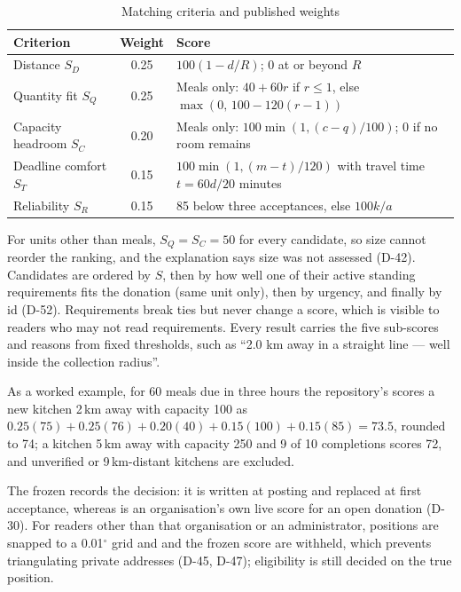 \begin{table}[!htbp]
\centering
\small
\begin{tabular}{|L{3.3cm}|c|L{8.3cm}|}
  \hline
  \textbf{Criterion} & \textbf{Weight} & \textbf{Score} \\
  \hline
  Distance $S_D$ & 0.25 & $100(1-d/R)$; 0 at or beyond $R$ \\
  \hline
  Quantity fit $S_Q$ & 0.25 & Meals only: $40+60r$ if $r\le1$, else $\max(0,\,100-120(r-1))$ \\
  \hline
  Capacity headroom $S_C$ & 0.20 & Meals only: $100\min(1,(c-q)/100)$; 0 if no room remains \\
  \hline
  Deadline comfort $S_T$ & 0.15 & $100\min(1,(m-t)/120)$ with travel time $t=60d/20$ minutes \\
  \hline
  Reliability $S_R$ & 0.15 & 85 below three acceptances, else $100k/a$ \\
  \hline
\end{tabular}
\caption{Matching criteria and published weights}
\label{tab:criteria}
\end{table}

For units other than meals, $S_Q=S_C=50$ for every candidate, so size cannot
reorder the ranking, and the explanation says size was not assessed (D-42).
Candidates are ordered by $S$, then by how well one of their active standing
requirements fits the donation (same unit only), then by urgency, and finally by
id (D-52). Requirements break ties but never change a score, which is visible to
readers who may not read requirements. Every result carries
the five sub-scores and reasons from fixed thresholds, such as ``2.0 km away in a
straight line --- well inside the collection radius''.

As a worked example, for 60 meals due in three hours the repository's
 scores a new kitchen 2\,km away with capacity 100 as
$0.25(75)+0.25(76)+0.20(40)+0.15(100)+0.15(85)=73.5$, rounded to 74; a kitchen
5\,km away with capacity 250 and 9 of 10 completions scores 72, and unverified or
9\,km-distant kitchens are excluded.

The frozen  records the decision: it is written at posting and
replaced at first acceptance, whereas  is an organisation's own
live score for an open donation (D-30). For readers other than that organisation
or an administrator, positions are snapped to a 0.01$^\circ$ grid and
 and the frozen score are withheld, which prevents triangulating
private addresses (D-45, D-47); eligibility is still decided on the true
position.

